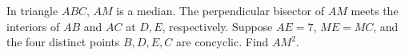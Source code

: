 In triangle $ABC$, $AM$ is a median. The perpendicular bisector of $AM$ meets the interiors of $AB$ and $AC$ at $D,E$, respectively. Suppose $AE=7$, $ME=MC$, and the four distinct points $B,D,E,C$ are concyclic. Find $AM^2$.
